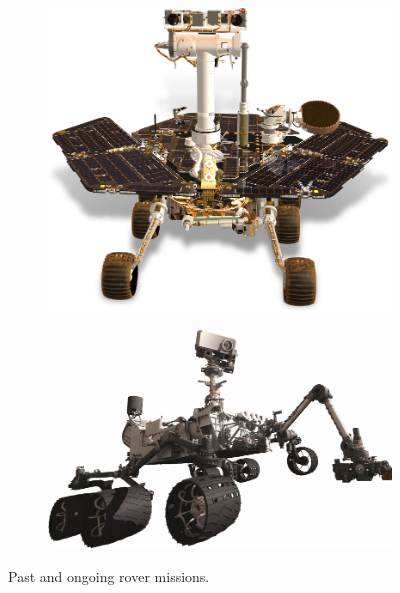 \begin{figure}[h]
\begin{subfigure}[t]{\subfigureWidth}
        \label{fig:sub:past-mission-rover-sojourner}
	\end{subfigure}\\[0.8ex]
	\begin{subfigure}[t]{\subfigureWidth}
        \centering
		\includegraphics[height=\graphicsHeight]{sections/state-of-the-art/past-missions/images/rover-mer.png}
		\label{fig:sub:past-mission-rovers-mer}
	\end{subfigure}\hspace*{0.5cm}
    \begin{subfigure}[t]{\subfigureWidth}
        \centering
		\includegraphics[height=\graphicsHeight]{sections/state-of-the-art/past-missions/images/rover-msl.png}
		\label{fig:sub:past-mission-rovers-msl}
	\end{subfigure}
    \caption[Past and ongoing rover missions]
            {Past and ongoing rover missions.}
	\label{fig:past-mission-rovers}
\vspace{-2ex}
\end{figure}

